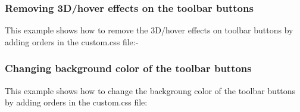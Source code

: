 \documentclass[letterpaper,10pt,english]{sphinxmanual}
\begin{document}
\subsubsection{Removing 3D/hover effects on the toolbar buttons}
\label{\detokenize{User_Guide:removing-3d-hover-effects-on-the-toolbar-buttons}}
This example shows how to remove the 3D/hover effects on toolbar buttons by adding orders in the custom.css file:-

\begin{sphinxVerbatim}[commandchars=\\\{\}]
          
       
 
 
 
\end{sphinxVerbatim}



\subsubsection{Changing background color of the toolbar buttons}
\label{\detokenize{User_Guide:changing-background-color-of-the-toolbar-buttons}}
This example shows how to change the backgroung color of the toolbar buttons by adding orders in the custom.css file:
\end{document}
